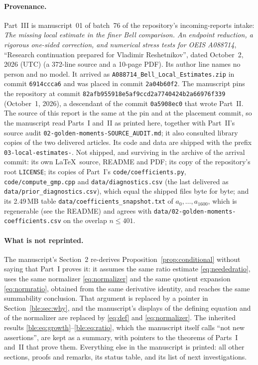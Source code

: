 \documentclass[11pt]{article}
\numberwithin{equation}{section}
\theoremstyle{definition}
\theoremstyle{remark}
\begin{document}
\paragraph{Provenance.}
Part~III is manuscript~01 of batch~76 of the repository's incoming-reports
intake: \emph{The missing local estimate in the finer Bell comparison. An
endpoint reduction, a rigorous one-sided correction, and numerical stress
tests for OEIS A088714}, ``Research continuation prepared for Vladimir
Reshetnikov'', dated October~2, 2026 (UTC) (a 372-line source and a
10-page PDF). Its author line names no person and no model. It arrived as
\nolinkurl{A088714_Bell_Local_Estimates.zip} in commit
\texttt{6914ccca6} and was placed in commit \texttt{2a04b60f2}. The
manuscript pins the repository at commit
\texttt{82afb955918e5af9ccd2a7740424b2a66976f339} (October~1, 2026), a
descendant of the commit \texttt{0a5908ec0} that wrote Part~II. The source
of this report is the same at the pin and at the placement commit, so the
manuscript read Parts~I and~II as printed here, together with Part~II's
source audit \nolinkurl{02-golden-moments-SOURCE_AUDIT.md}; it also
consulted library copies of the two delivered articles. Its code and data
are shipped with the prefix \texttt{03-local-estimates-}. Not shipped, and
surviving in the archive of the arrival commit: its own \LaTeX\ source,
README and PDF; its copy of the repository's root \texttt{LICENSE}; its
copies of Part~I's \nolinkurl{code/coefficients.py},
\nolinkurl{code/compute_gmp.cpp} and \nolinkurl{data/diagnostics.csv} (the last
delivered as \nolinkurl{data/prior_diagnostics.csv}), which equal the shipped
files byte for byte; and its 2.49\,MB table
\nolinkurl{data/coefficients_snapshot.txt} of $a_0,\ldots,a_{1600}$, which
is regenerable (see the README) and agrees with
\nolinkurl{data/02-golden-moments-coefficients.csv} on the overlap
$n\le401$.

\paragraph{What is not reprinted.}
The manuscript's Section~2 re-derives Proposition~\ref{prop:conditional}
without saying that Part~I proves it: it assumes the same ratio estimate
\eqref{eq:neededratio}, uses the same normalizer \eqref{eq:normalizer}
and the same quotient expansion \eqref{eq:normratio}, obtained from the
same derivative identity, and reaches the same summability conclusion.
That argument is replaced by a pointer in Section~\ref{ble:sec:why}, and
the manuscript's displays of the defining equation and of the normalizer
are replaced by \eqref{eq:def} and \eqref{eq:normalizer}. The inherited
results \eqref{ble:eq:growth}--\eqref{ble:eq:ratio}, which the manuscript
itself calls ``not new assertions'', are kept as a summary, with pointers
to the theorems of Parts~I and~II that prove them. Everything else in the
manuscript is printed: all other sections, proofs and remarks, its status
table, and its list of next investigations.
\end{document}
